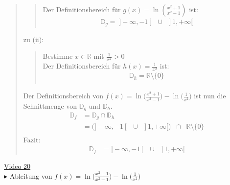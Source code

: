 \begin{quote}
\begin{quote}
		Der Definitionsbereich für $ g(x)=\ln(\frac{x^2+1}{x^2-1}) $ ist:\\
		\begin{align*}
		\mathbb{D}_g= \; ]-\infty,-1[\;\;\cup \;\;]1,+\infty[
		\end{align*}
	\end{quote}
	zu (ii):\\
	\begin{quote}
		Bestimme $ x\in \mathbb{R} $ mit $ \frac{1}{x^2}>0 $\\
		Der Definitionsbereich für $h(x)=\frac{1}{x^2}$ ist:\\
		\begin{align*}
		\mathbb{D}_h=\mathbb{R}\setminus \{0\}\\
		\end{align*}	
	\end{quote}
\newpage
\noindent
	Der Definitionsbereich von $ f(x)=\ln\bigg(\frac{x^2+1}{x^2-1}\bigg)-\ln\bigg(\frac{1}{x^2}\bigg) $ ist nun die Schnittmenge von $ \mathbb{D}_g $ und $ \mathbb{D}_h $.\\
	\begin{align*}
	\mathbb{D}_f&=\mathbb{D}_g\cap\mathbb{D}_h\\
	&=\big(]-\infty,-1[\;\;\cup \;\;]1,+\infty[\big)\;\;\cap\;\;\mathbb{R}\setminus \{0\}\\
	\end{align*}
	Fazit:\\
	\begin{align*}
	\mathbb{D}_f&=]-\infty,-1[\;\;\cup \;\;]1,+\infty[
	\end{align*}
\end{quote}
\href{https://youtu.be/3Xab3Mt4204}{Video 20}\\
$ \blacktriangleright $ Ableitung von $ f(x)=\ln\bigg(\frac{x^2+1}{x^2-1}\bigg)-\ln\bigg(\frac{1}{x^2}\bigg) $\\
